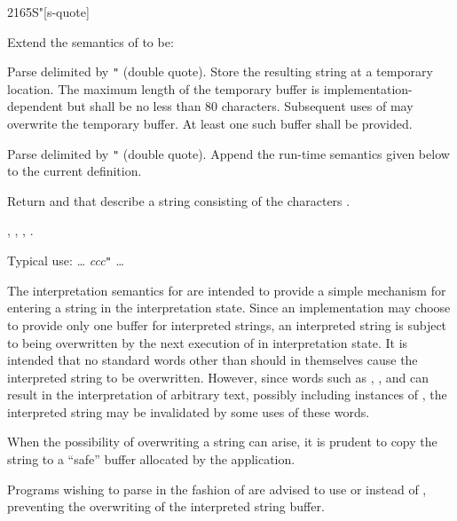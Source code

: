 \begin{worddef}[Sq]{2165}{S"}[s-quote]
\item Extend the semantics of  to be:

\interpret

	Parse  delimited by \texttt{"} (double quote). Store
	the resulting string  at a temporary location.
	The maximum length of the temporary buffer is
	implementation-dependent but shall be no less than 80 characters.
	Subsequent uses of  may overwrite the temporary buffer.
	At least one such buffer shall be provided.

\compile

	Parse  delimited by \texttt{"} (double quote). Append
	the run-time semantics given below to the current definition.

\runtime

	Return  and  that describe a string
	consisting of the characters .

\see {},
	,
	,
	.

	\begin{rationale} %
		Typical use:
			{\ldots}  \emph{ccc}\texttt{"} {\ldots}

		The interpretation semantics for  are intended to
		provide a simple mechanism for entering a string in the
		interpretation state. Since an implementation may choose to
		provide only one buffer for interpreted strings, an
		interpreted string is subject to being overwritten by the
		next execution of  in interpretation state. It is
		intended that no standard words other than  should
		in themselves cause the interpreted string to be overwritten.
		However, since words such as ,
		,  and
		 can result in the interpretation of arbitrary
		text, possibly including instances of , the
		interpreted string may be invalidated by some uses of these
		words.

		When the possibility of overwriting a string can arise, it is
		prudent to copy the string to a ``safe'' buffer allocated by
		the application.

		Programs wishing to parse in the fashion of  are
		advised to use  or 
		 instead of , preventing the
		overwriting of the interpreted string buffer.
	\end{rationale}
\end{worddef}


